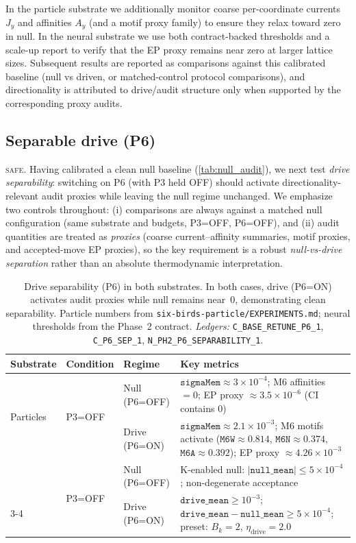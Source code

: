 \documentclass[11pt]{article}
\newcommand{\SAFE}{\textsc{safe}}
\begin{document}
In the particle substrate we additionally monitor coarse per-coordinate currents $J_y$ and affinities $A_y$ (and a motif proxy family) to ensure they relax toward zero in null. In the neural substrate we use both contract-backed thresholds and a scale-up report to verify that the EP proxy remains near zero at larger lattice sizes. Subsequent results are reported as comparisons against this calibrated baseline (null vs driven, or matched-control protocol comparisons), and directionality is attributed to drive/audit structure only when supported by the corresponding proxy audits.

\subsection{Separable drive (P6)}\label{sec:results:p6}
\SAFE. Having calibrated a clean null baseline (\cref{tab:null_audit}), we next test \emph{drive separability}: switching on P6 (with P3 held OFF) should activate directionality-relevant audit proxies while leaving the null regime unchanged. We emphasize two controls throughout: (i) comparisons are always against a matched null configuration (same substrate and budgets, P3=OFF, P6=OFF), and (ii) audit quantities are treated as \emph{proxies} (coarse current--affinity summaries, motif proxies, and accepted-move EP proxies), so the key requirement is a robust \emph{null-vs-drive separation} rather than an absolute thermodynamic interpretation.

\begin{table}[t]
\centering
\small
\begin{tabularx}{\textwidth}{@{}l l l X@{}}
\toprule
Substrate & Condition & Regime & Key metrics \\
\midrule
\multirow{2}{*}{Particles}
& \multirow{2}{*}{P3=OFF} & Null (P6=OFF) & $\texttt{sigmaMem}\approx 3\times 10^{-4}$; M6 affinities $=0$; EP proxy $\approx 3.5\times 10^{-6}$ (CI contains 0) \\
\cmidrule{3-4}
& & Drive (P6=ON) & $\texttt{sigmaMem}\approx 2.1\times 10^{-3}$; M6 motifs activate ($\texttt{M6W}\approx 0.814$, $\texttt{M6N}\approx 0.374$, $\texttt{M6A}\approx 0.392$); EP proxy $\approx 4.26\times 10^{-3}$ \\
\addlinespace
\multirow{2}{*}{Neural}
& \multirow{2}{*}{P3=OFF} & Null (P6=OFF) & K-enabled null: $|\texttt{null\_mean}|\le 5\times 10^{-4}$; non-degenerate acceptance \\
\cmidrule{3-4}
& & Drive (P6=ON) & $\texttt{drive\_mean}\ge 10^{-3}$; $\texttt{drive\_mean}-\texttt{null\_mean}\ge 5\times 10^{-4}$; preset: $B_k{=}2$, $\eta_{\mathrm{drive}}{=}2.0$ \\
\bottomrule
\end{tabularx}
\caption{Drive separability (P6) in both substrates. In both cases, drive (P6=ON) activates audit proxies while null remains near~0, demonstrating clean separability. Particle numbers from \texttt{six-birds-particle/EXPERIMENTS.md}; neural thresholds from the Phase~2 contract. \textit{Ledgers:} \texttt{C\_BASE\_RETUNE\_P6\_1}, \texttt{C\_P6\_SEP\_1}, \texttt{N\_PH2\_P6\_SEPARABILITY\_1}.}
\label{tab:p6_separability}
\end{table}
\end{document}
